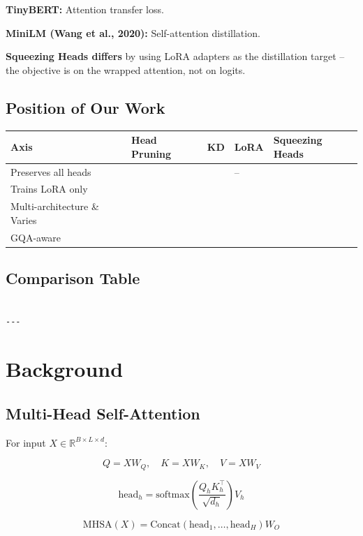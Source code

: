 \textbf{TinyBERT:} Attention transfer loss.

\textbf{MiniLM (Wang et al., 2020):} Self-attention distillation.

\textbf{Squeezing Heads differs} by using LoRA adapters as the distillation 
target -- the objective is on the wrapped attention, not on logits.

\subsection{Position of Our Work}

\begin{table}[H]
\centering
\small
\begin{tabular}{lllll}
\toprule
\textbf{Axis} & \textbf{Head Pruning} & \textbf{KD} & \textbf{LoRA} & \textbf{Squeezing Heads} \\
\midrule
Preserves all heads &  &  & -- &  \\
Trains LoRA only &  &  &  &  \\
Multi-architecture \& Varies &  &  &  \\
GQA-aware &  &  &  &  \\
\bottomrule
\end{tabular}
\end{table}

\subsection{Comparison Table}

\begin{lstlisting}

---
\end{lstlisting}


\section{Background}

\subsection{Multi-Head Self-Attention}

For input $X \in \mathbb{R}^{B \times L \times d}$:

\[
Q = X W_Q, \quad K = X W_K, \quad V = X W_V
\]

\[
\text{head}_h = \text{softmax}\!\left(\frac{Q_h K_h^\top}{\sqrt{d_h}}\right) V_h
\]

\[
\text{MHSA}(X) = \text{Concat}(\text{head}_1, \dots, \text{head}_H) W_O
\]

